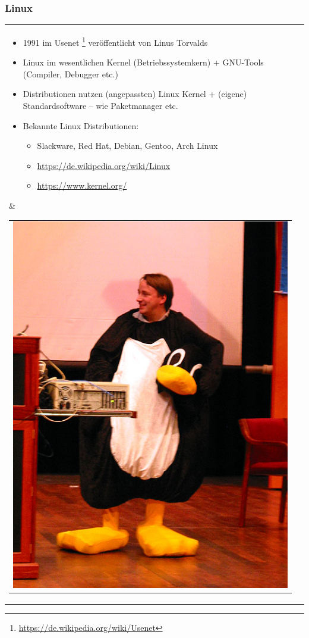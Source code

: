 \documentclass[xcolor=dvipsnames,aspectratio=169]{beamer}
\begin{document}
\begin{frame}
	\frametitle{Linux}
 \begin{tabular}{lc}
\hspace{-1.3cm}
 \parbox{0.65\linewidth}{
 \vspace{-1cm}
\begin{itemize}
	\item 1991 im Usenet \footnote{\url{https://de.wikipedia.org/wiki/Usenet}} veröffentlicht von Linus Torvalds
	\item Linux im wesentlichen Kernel (Betriebssystemkern) + GNU-Tools (Compiler, Debugger etc.)
	\item Distributionen nutzen (angepassten) Linux Kernel + (eigene) Standardsoftware -- wie Paketmanager etc.
	\item Bekannte Linux Distributionen:
	\begin{itemize}
	\item Slackware, Red Hat, Debian, Gentoo, Arch Linux
	\item \url{https://de.wikipedia.org/wiki/Linux}
	\item \url{https://www.kernel.org/}
	\end{itemize}
\end{itemize} } 
& \begin{tabular}{c}
 \hspace{-0.5cm}
           \includegraphics[scale=0.215]{linus}
           \end{tabular}
\end{tabular}
\end{frame}
\end{document}
